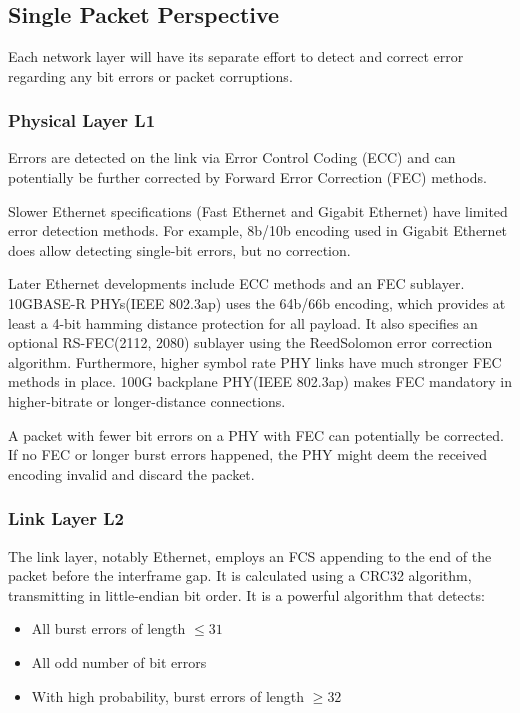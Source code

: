 \documentclass[12pt]{article}
\begin{document}
\section{}

\subsection{Single Packet Perspective}

Each network layer will have its separate effort to detect and correct error regarding any bit errors or packet corruptions.

\subsubsection{Physical Layer L1}

Errors are detected on the link via Error Control Coding (ECC) and 
can potentially be further corrected by Forward Error Correction (FEC) methods. 

Slower Ethernet specifications (Fast Ethernet and Gigabit Ethernet) have limited error detection methods. For example, 8b/10b encoding used in Gigabit Ethernet does allow detecting single-bit errors, but no correction.

Later Ethernet developments include ECC methods and an FEC sublayer. 10GBASE-R PHYs(IEEE 802.3ap) uses the 64b/66b encoding, which provides at least a 4-bit hamming distance protection for all payload. It also specifies an optional RS-FEC(2112, 2080) sublayer using the Reed\textemdash Solomon error correction algorithm. Furthermore, higher symbol rate PHY links have much stronger FEC methods in place. 100G backplane PHY(IEEE 802.3ap) makes FEC mandatory in higher-bitrate or longer-distance connections.

A packet with fewer bit errors on a PHY with FEC can potentially be corrected. If no FEC or longer burst errors happened, the PHY might deem the received encoding invalid and discard the packet.

\subsubsection{Link Layer L2}

The link layer, notably Ethernet, employs an FCS appending to the end of the packet before the interframe gap. It is calculated using a CRC32 algorithm, transmitting in little-endian bit order. It is a powerful algorithm that detects:
\begin{itemize}
    \item All burst errors of length $\leq 31$
    \item All odd number of bit errors
    \item With high probability, burst errors of length $\geq 32$
\end{itemize}
\end{document}
